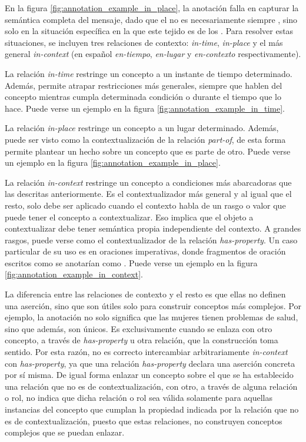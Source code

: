 En la figura \ref{fig:annotation_example_in_place}, la anotación  falla en capturar la semántica completa del mensaje, dado que el  no es necesariamente siempre , sino solo en la situación específica en la que este tejido es de los . Para resolver estas situaciones, se incluyen tres relaciones de contexto: \textit{in-time}, \textit{in-place} y el más general \textit{in-context} (en español \textit{en-tiempo}, \textit{en-lugar} y \textit{en-contexto} respectivamente).

La relación \textit{in-time} restringe un concepto a un instante de tiempo determinado. Además, permite atrapar restricciones más generales, siempre que hablen del concepto mientras cumpla determinada condición o durante el tiempo que lo hace. Puede verse un ejemplo en la figura \ref{fig:annotation_example_in_time}.

La relación \textit{in-place} restringe un concepto a un lugar determinado. Además, puede ser visto como la contextualización de la relación \textit{part-of}, de esta forma permite plantear un hecho sobre un concepto que es parte de otro. Puede verse un ejemplo en la figura \ref{fig:annotation_example_in_place}.

La relación \textit{in-context} restringe un concepto a condiciones más abarcadoras que las descritas anteriormente. Es el contextualizador más general y al igual que el resto, solo debe ser aplicado cuando el contexto habla de un rasgo o valor que puede tener el concepto a contextualizar. Eso implica que el objeto a contextualizar debe tener semántica propia independiente del contexto. A grandes rasgos, puede verse como el contextualizador de la relación \textit{has-property}. Un caso particular de su uso es en oraciones imperativas, donde fragmentos de oración escritos como  se anotarían como . Puede verse un ejemplo en la figura \ref{fig:annotation_example_in_context}.

La diferencia entre las relaciones de contexto y el resto es que ellas no definen una aserción, sino que son útiles solo para construir conceptos más complejos. Por ejemplo, la anotación  no solo significa que las mujeres tienen problemas de salud, sino que además, son únicos. Es exclusivamente cuando se enlaza con otro concepto, a través de \textit{has-property} u otra relación, que la construcción toma sentido. Por esta razón, no es correcto intercambiar arbitrariamente \textit{in-context} con \textit{has-property}, ya que una relación \textit{has-property} declara una aserción concreta por sí misma. De igual forma enlazar un concepto sobre el que se ha establecido una relación que no es de contextualización, con otro, a través de alguna relación o rol, no indica que dicha relación o rol sea válida solamente para aquellas instancias del concepto que cumplan la propiedad indicada por la relación que no es de contextualización, puesto que estas relaciones, no construyen conceptos complejos que se puedan enlazar.

